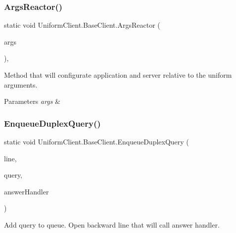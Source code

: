 \subsubsection{\texorpdfstring{Args\+Reactor()}{ArgsReactor()}}
{\footnotesize\ttfamily static void Uniform\+Client.\+Base\+Client.\+Args\+Reactor (\begin{DoxyParamCaption}\item[{string \mbox{[}$\,$\mbox{]}}]{args }\end{DoxyParamCaption})\hspace{0.3cm}{\ttfamily [static]}, {\ttfamily [protected]}}



Method that will configurate application and server relative to the uniform arguments. 


\begin{DoxyParams}{Parameters}
{\em args} & \\
\hline
\end{DoxyParams}
\mbox{\label{class_uniform_client_1_1_base_client_a5c092f6636f68caa6deb55c3c1dfa61e}} 
\subsubsection{\texorpdfstring{Enqueue\+Duplex\+Query()}{EnqueueDuplexQuery()}\hspace{0.1cm}{\footnotesize\ttfamily [1/2]}}
{\footnotesize\ttfamily static void Uniform\+Client.\+Base\+Client.\+Enqueue\+Duplex\+Query (\begin{DoxyParamCaption}\item[{\mbox{\hyperlink{class_pipes_provider_1_1_client_1_1_transmission_line}{Transmission\+Line}}}]{line,  }\item[{string}]{query,  }\item[{System.\+Action$<$ \mbox{\hyperlink{class_pipes_provider_1_1_client_1_1_transmission_line}{Transmission\+Line}}, object $>$}]{answer\+Handler }\end{DoxyParamCaption})\hspace{0.3cm}{\ttfamily [static]}}



Add query to queue. Open backward line that will call answer handler. 


